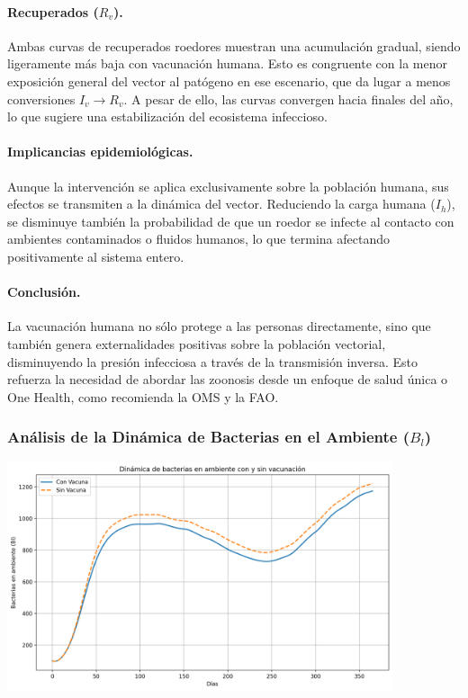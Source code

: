 \documentclass[12pt,a4paper]{article}
\begin{document}
\paragraph{Recuperados ($R_v$).} Ambas curvas de recuperados roedores muestran una acumulación gradual, siendo ligeramente más baja con vacunación humana. Esto es congruente con la menor exposición general del vector al patógeno en ese escenario, que da lugar a menos conversiones $I_v \rightarrow R_v$. A pesar de ello, las curvas convergen hacia finales del año, lo que sugiere una estabilización del ecosistema infeccioso.

\paragraph{Implicancias epidemiológicas.} Aunque la intervención se aplica exclusivamente sobre la población humana, sus efectos se transmiten a la dinámica del vector. Reduciendo la carga humana ($I_h$), se disminuye también la probabilidad de que un roedor se infecte al contacto con ambientes contaminados o fluidos humanos, lo que termina afectando positivamente al sistema entero.

\paragraph{Conclusión.} La vacunación humana no sólo protege a las personas directamente, sino que también genera externalidades positivas sobre la población vectorial, disminuyendo la presión infecciosa a través de la transmisión inversa. Esto refuerza la necesidad de abordar las zoonosis desde un enfoque de salud única o One Health, como recomienda la OMS y la FAO.


\subsubsection[Análisis de la Dinámica de Bacterias en el Ambiente (Bl)]{Análisis de la Dinámica de Bacterias en el Ambiente ($B_l$)}


\includegraphics[width=0.85\textwidth]{Images/ambiente.png}
\end{document}
